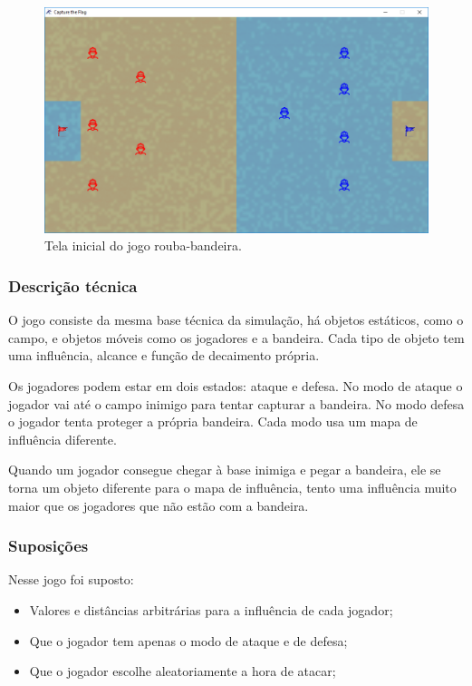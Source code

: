 \documentclass[a4paper]{article}
\begin{document}
\begin{figure}
\centering
\includegraphics[width=1\textwidth]{capture-the-flag.png}
\caption{\label{fig:capture-the-flag} Tela inicial do jogo rouba-bandeira.}
\end{figure}

\subsubsection{Descrição técnica}
O jogo consiste da mesma base técnica da simulação, há objetos estáticos, como o campo, e objetos móveis como os jogadores e a bandeira. Cada tipo de objeto tem uma influência, alcance e função de decaimento própria.

Os jogadores podem estar em dois estados: ataque e defesa. No modo de ataque o jogador vai até o campo inimigo para tentar capturar a bandeira. No modo defesa o jogador tenta proteger a própria bandeira. Cada modo usa um mapa de influência diferente.

Quando um jogador consegue chegar à base inimiga e pegar a bandeira, ele se torna um objeto diferente para o mapa de influência, tento uma influência muito maior que os jogadores que não estão com a bandeira.

\subsubsection{Suposições}
Nesse jogo foi suposto:

\begin{itemize}
\item Valores e distâncias arbitrárias para a influência de cada jogador;
\item Que o jogador tem apenas o modo de ataque e de defesa;
\item Que o jogador escolhe aleatoriamente a hora de atacar;
\end{itemize}
\end{document}
